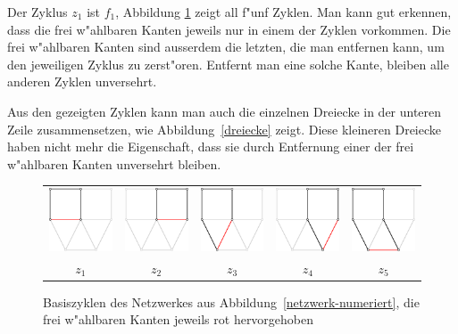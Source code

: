 Der Zyklus $z_1$ ist $f_1$, Abbildung \ref{basiszyklen} zeigt all
f"unf Zyklen. Man kann gut erkennen, dass die frei w"ahlbaren Kanten
jeweils nur in einem der Zyklen vorkommen. Die frei w"ahlbaren Kanten
sind ausserdem die letzten, die man entfernen kann, um den jeweiligen
Zyklus zu zerst"oren. Entfernt man eine solche Kante, bleiben alle
anderen Zyklen unversehrt.

Aus den gezeigten Zyklen
kann man auch die einzelnen Dreiecke in der unteren Zeile zusammensetzen,
wie Abbildung~\ref{dreiecke} zeigt. Diese kleineren Dreiecke haben nicht
mehr die Eigenschaft, dass sie durch Entfernung einer der frei w"ahlbaren
Kanten unversehrt bleiben.
\begin{figure}
\begin{center}
\begin{tabular}{ccccc}
\includegraphics[width=0.17\hsize]{images/kirchhoff-10}&
\includegraphics[width=0.17\hsize]{images/kirchhoff-6}&
\includegraphics[width=0.17\hsize]{images/kirchhoff-7}&
\includegraphics[width=0.17\hsize]{images/kirchhoff-8}&
\includegraphics[width=0.17\hsize]{images/kirchhoff-9}\\
$z_1$&
$z_2$&
$z_3$&
$z_4$&
$z_5$\\
\end{tabular}
\end{center}
\caption{Basiszyklen des Netzwerkes aus
Abbildung~\ref{netzwerk-numeriert},
die frei w"ahlbaren Kanten jeweils rot hervorgehoben
\label{basiszyklen}}
\end{figure}
